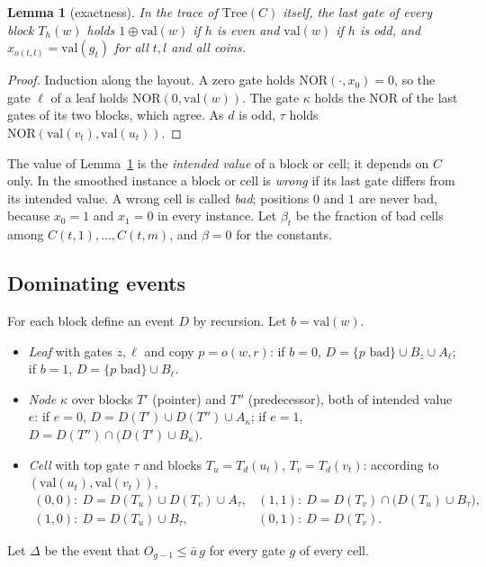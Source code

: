 \documentclass[11pt]{amsart}
\newtheorem{lemma}[theorem]{Lemma}
\theoremstyle{definition}
\theoremstyle{remark}
\newcommand{\NOR}{\mathrm{NOR}}
\newcommand{\val}{\mathrm{val}}
\begin{document}
\begin{lemma}[exactness]\label{lem:exact}
In the trace of $\mathrm{Tree}(C)$ itself, the last gate of every block $T_h(w)$ holds
$1\oplus\val(w)$ if $h$ is even and $\val(w)$ if $h$ is odd, and $x_{o(t,l)}=\val(g_t)$ for all
$t,l$ and all coins.
\end{lemma}

\begin{proof}
Induction along the layout. A zero gate holds $\NOR(\cdot,x_0)=0$, so the gate $\ell$ of a leaf
holds $\NOR(0,\val(w))$. The gate $\kappa$ holds the NOR of the last gates of its two blocks,
which agree. As $d$ is odd, $\tau$ holds $\NOR(\val(v_t),\val(u_t))$.
\end{proof}

The value of Lemma~\ref{lem:exact} is the \emph{intended value} of a block or cell; it depends on
$C$ only. In the smoothed instance a block or cell is \emph{wrong} if its last gate differs from
its intended value. A wrong cell is called \emph{bad}; positions $0$ and $1$ are never bad, because
$x_0=1$ and $x_1=0$ in every instance. Let $\beta_t$ be the fraction of bad cells among
$C(t,1),\dots,C(t,m)$, and $\beta=0$ for the constants.

\subsection{Dominating events}

For each block define an event $D$ by recursion. Let $b=\val(w)$.
\begin{itemize}[leftmargin=2em]
\item \emph{Leaf} with gates $z,\ell$ and copy $p=o(w,r)$: if $b=0$,
$D=\{p\text{ bad}\}\cup B_z\cup A_\ell$; if $b=1$, $D=\{p\text{ bad}\}\cup B_\ell$.
\item \emph{Node} $\kappa$ over blocks $T'$ (pointer) and $T''$ (predecessor), both of intended
value $e$: if $e=0$, $D=D(T')\cup D(T'')\cup A_\kappa$; if $e=1$,
$D=D(T'')\cap\bigl(D(T')\cup B_\kappa\bigr)$.
\item \emph{Cell} with top gate $\tau$ and blocks $T_u=T_d(u_t)$, $T_v=T_d(v_t)$: according to
$(\val(u_t),\val(v_t))$,
\[
\begin{array}{ll}
(0,0):\ D=D(T_u)\cup D(T_v)\cup A_\tau, & (1,1):\ D=D(T_v)\cap\bigl(D(T_u)\cup B_\tau\bigr),\\[2pt]
(1,0):\ D=D(T_u)\cup B_\tau, & (0,1):\ D=D(T_v).
\end{array}
\]
\end{itemize}
Let $\Delta$ be the event that $O_{g-1}\le\bar a\,g$ for every gate $g$ of every cell.
\end{document}
